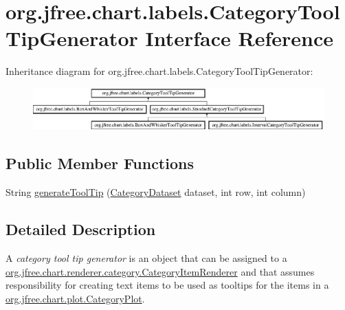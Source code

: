 \hypertarget{interfaceorg_1_1jfree_1_1chart_1_1labels_1_1_category_tool_tip_generator}{}\section{org.\+jfree.\+chart.\+labels.\+Category\+Tool\+Tip\+Generator Interface Reference}
\label{interfaceorg_1_1jfree_1_1chart_1_1labels_1_1_category_tool_tip_generator}
Inheritance diagram for org.\+jfree.\+chart.\+labels.\+Category\+Tool\+Tip\+Generator\+:\begin{figure}[H]
\begin{center}
\leavevmode
\includegraphics[height=1.627907cm]{interfaceorg_1_1jfree_1_1chart_1_1labels_1_1_category_tool_tip_generator}
\end{center}
\end{figure}
\subsection*{Public Member Functions}
\begin{DoxyCompactItemize}
\item 
String \mbox{\hyperlink{interfaceorg_1_1jfree_1_1chart_1_1labels_1_1_category_tool_tip_generator_a2e8b22f2efaaf190fa281212485e1018}{generate\+Tool\+Tip}} (\mbox{\hyperlink{interfaceorg_1_1jfree_1_1data_1_1category_1_1_category_dataset}{Category\+Dataset}} dataset, int row, int column)
\end{DoxyCompactItemize}


\subsection{Detailed Description}
A {\itshape category tool tip generator} is an object that can be assigned to a \mbox{\hyperlink{interfaceorg_1_1jfree_1_1chart_1_1renderer_1_1category_1_1_category_item_renderer}{org.\+jfree.\+chart.\+renderer.\+category.\+Category\+Item\+Renderer}} and that assumes responsibility for creating text items to be used as tooltips for the items in a \mbox{\hyperlink{classorg_1_1jfree_1_1chart_1_1plot_1_1_category_plot}{org.\+jfree.\+chart.\+plot.\+Category\+Plot}}. 

